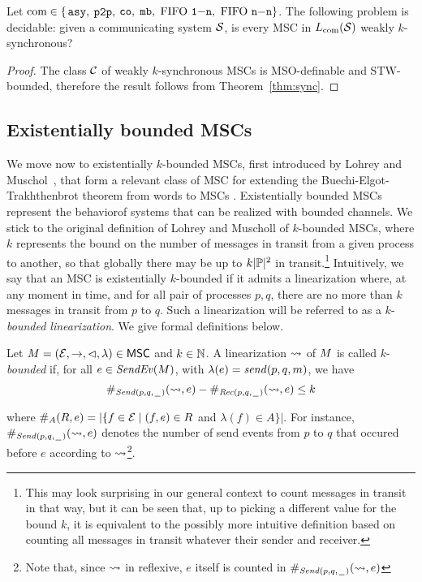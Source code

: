 \begin{proposition}\label{thm:weak-k-sync}
	Let $\comsymb \in \{$$\asy, $ $\oneone, $ $\co, $ $\none, $ $\onen, $ $\nn\}$.
	The following problem is decidable:
	given a communicating system $\System$,
	is every MSC in $\cL{\System}$ weakly $k$-synchronous?
\end{proposition}
\begin{proof}
	The class $\aMSCclass$ of weakly $k$-synchronous MSCs is MSO-definable and STW-bounded, therefore the
	result follows from Theorem~\ref{thm:sync}.
\end{proof}

\subsection{Existentially bounded MSCs}

We move now to existentially $k$-bounded MSCs, first introduced by Lohrey and Muschol~\cite{DBLP:conf/fossacs/LohreyM02}, that form a relevant class of MSC for extending the
Buechi-Elgot-Trakhthenbrot theorem from words to MSCs \cite{genest2004kleene,GKM07}. 
Existentially bounded MSCs represent the behaviorof systems that can be realized with bounded channels. 
We stick to the original definition of Lohrey and Muscholl of $k$-bounded MSCs, where $k$
represents the bound on the number of messages in transit from a given process to another, so that globally
there may be up to $k\cardinalof{\procSet}^2$ in transit.\footnote{This may look
surprising in our general context to count messages in transit in that way, but it can be seen that, up to picking
a different value for the bound $k$, it is equivalent to the possibly more
intuitive definition based on counting all messages in transit whatever their sender and receiver.}
Intuitively, we say that an MSC is existentially $k$-bounded if it admits a linearization where, at any moment in time, and for all pair of processes $p,q$, there are no more than $k$ messages in transit from $p$ to $q$. Such a linearization will be referred to as a $k$-\emph{bounded linearization}. We give formal definitions below.

\begin{definition}\label{def:lin_k_bounded}
	Let $\msc = (\Events,\procrel,\lhd,\lambda) \in \MSCs$ and $k \in \N$.
	A linearization $\linrel$ of $\msc$ is called
	$k$-\emph{bounded} if, for all $e \in \SendEv{\msc}$, with $\lambda(e) = \sact{p}{q}{\msg}$, we have
	\[
	\sametype{e}{\pqsAct{p}{q}}{\linrel} - \sametype{e}{\pqrAct{p}{q}}{\linrel} \le k
	\]
\end{definition}
\noindent where $\sametype{e}{A}{\rel} = |\{f \in \Events \mid (f,e) \in \rel$ and $\lambda(f) \in A\}|$.
For instance, $\sametype{e}{\pqsAct{p}{q}}{\linrel}$ denotes the number of send events from $p$ to $q$ that occured before $e$ according to $\linrel$\footnote{Note that, since $\linrel$ in reflexive, $e$ itself is counted in $\sametype{e}{\pqsAct{p}{q}}{\linrel}$}.

